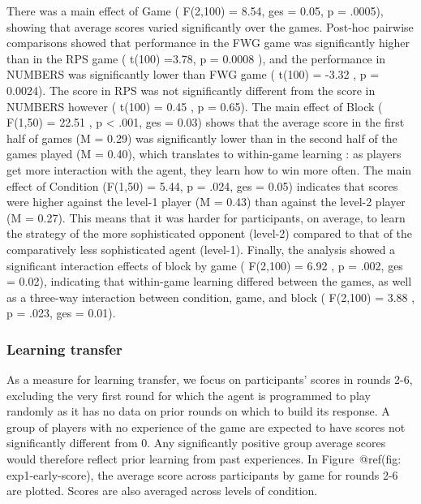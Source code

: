 \documentclass[man,floatsintext]{apa6}
\begin{document}
There was a main effect of Game ( F(2,100) = 8.54, ges = 0.05, p = .0005), showing that average scores varied significantly over the games. Post-hoc pairwise comparisons showed that performance in the FWG game was significantly higher than in the RPS game ( t(100) =3.78, p = 0.0008 ), and the performance in NUMBERS was significantly lower than FWG game ( t(100) = -3.32 , p = 0.0024). The score in RPS was not significantly different from the score in NUMBERS however ( t(100) = 0.45 , p = 0.65). The main effect of Block ( F(1,50) = 22.51 , p \textless{} .001, ges = 0.03) shows that the average score in the first half of games (M = 0.29) was significantly lower than in the second half of the games played (M = 0.40), which translates to within-game learning : as players get more interaction with the agent, they learn how to win more often. The main effect of Condition (F(1,50) = 5.44, p = .024, ges = 0.05) indicates that scores were higher against the level-1 player (M = 0.43) than against the level-2 player (M = 0.27). This means that it was harder for participants, on average, to learn the strategy of the more sophisticated opponent (level-2) compared to that of the comparatively less sophisticated agent (level-1). Finally, the analysis showed a significant interaction effects of block by game ( F(2,100) = 6.92 , p = .002, ges = 0.02), indicating that within-game learning differed between the games, as well as a three-way interaction between condition, game, and block ( F(2,100) = 3.88 , p = .023, ges = 0.01).

\hypertarget{learning-transfer}{%
\subsubsection{Learning transfer}\label{learning-transfer}}

As a measure for learning transfer, we focus on participants' scores in rounds 2-6, excluding the very first round for which the agent is programmed to play randomly as it has no data on prior rounds on which to build its response. A group of players with no experience of the game are expected to have scores not significantly different from 0. Any significantly positive group average scores would therefore reflect prior learning from past experiences. In Figure~@ref(fig: exp1-early-score), the average score across participants by game for rounds 2-6 are plotted. Scores are also averaged across levels of condition.
\end{document}
